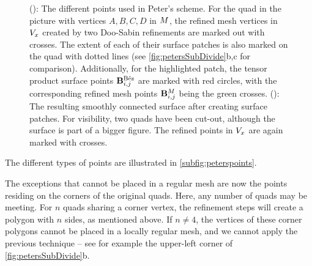 \begin{figure}
\begin{center}
\begin{subfigure}[b]{.49\textwidth}
\begin{center}
\label{subfig:smoothsurf}
\end{center}
\end{subfigure}
\caption{(): The different points used in Peter's scheme. For the quad in the picture with vertices $A,B,C,D$ in $\petersControlMesh$, the refined mesh vertices in $\petersPatchPoints$ created by two Doo-Sabin refinements are marked out with crosses. The extent of each of their \Bez surface patches is also marked on the quad with dotted lines (see \autoref{fig:petersSubDivide}b,c for comparison). Additionally, for the highlighted patch, the tensor product \Bez surface points $\petersLocalBezPointIndices{i,j}$ are marked with red circles, with the corresponding refined mesh points $\petersLocalPatchPointIndices{i,j}$ being the green crosses. (): The resulting smoothly connected surface after creating \Bez surface patches. For visibility, two quads have been cut-out, although the surface is part of a bigger figure. The refined points in $\petersPatchPoints$ are again marked with crosses.}
\label{fig:petersDiags}
\end{center}
\end{figure}

The different types of points are illustrated in \autoref{subfig:peterspoints}.


%
The exceptions that cannot be placed in a regular mesh are now the points residing on the corners of the original quads. 
Here, any number of quads may be meeting.
 For $n$ quads sharing a corner vertex, the refinement steps will create a polygon with $n$ sides, as mentioned above. If $n\neq4$, the vertices of these corner polygons cannot be placed in a locally regular mesh, and we cannot apply the previous technique -- see for example the upper-left corner of \autoref{fig:petersSubDivide}b.

